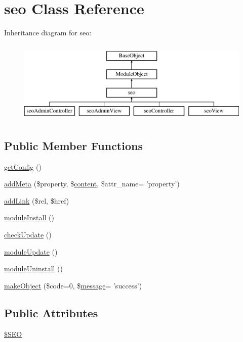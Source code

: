 \hypertarget{classseo}{\section{seo Class Reference}
\label{classseo}
}
Inheritance diagram for seo\-:\begin{figure}[H]
\begin{center}
\leavevmode
\includegraphics[height=4.000000cm]{classseo}
\end{center}
\end{figure}
\subsection*{Public Member Functions}
\begin{DoxyCompactItemize}
\item 
\hyperlink{classseo_abb0927c5d29b6109753207a9919773ac}{get\-Config} ()
\item 
\hyperlink{classseo_a095d0ac460095a97fa61432460e32920}{add\-Meta} (\$property, \$\hyperlink{classcontent}{content}, \$attr\-\_\-name= 'property')
\item 
\hyperlink{classseo_ac31f0b7fc948b86a4218405d3a4df455}{add\-Link} (\$rel, \$href)
\item 
\hyperlink{classseo_a8e4816d74392c9d119822a9b9e966285}{module\-Install} ()
\item 
\hyperlink{classseo_a503588357a5fd30094cbd636cb039bd7}{check\-Update} ()
\item 
\hyperlink{classseo_a7ca6b6de7368cc0ec8e1e0c21e3f93ae}{module\-Update} ()
\item 
\hyperlink{classseo_a0852c70c409ab20ce2533a234137c21f}{module\-Uninstall} ()
\item 
\hyperlink{classseo_a98bacdd7c3e4b842299c3013c59ecce9}{make\-Object} (\$code=0, \$\hyperlink{classmessage}{message}= 'success')
\end{DoxyCompactItemize}
\subsection*{Public Attributes}
\begin{DoxyCompactItemize}
\item 
\hyperlink{classseo_a62e2daf05c8f89d686771b4784e47b3d}{\$\-S\-E\-O}
\end{DoxyCompactItemize}
